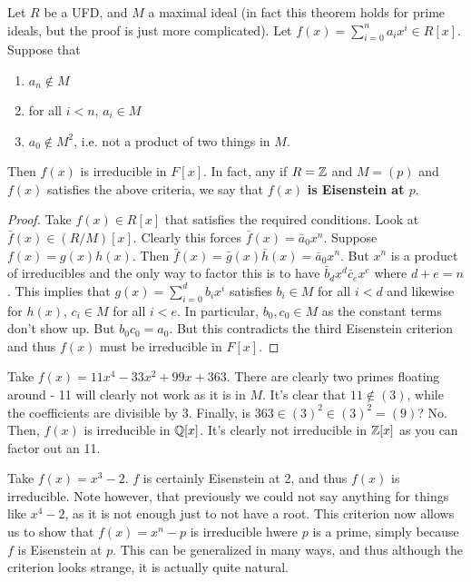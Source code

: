 \documentclass{../mathnotes}
\begin{document}
\begin{thm}
    Let $R$ be a UFD, and $M$ a maximal ideal (in fact this theorem holds for prime ideals, but the proof is just more complicated).
    Let $f(x)=\sum_{i=0}^na_ix^i\in R[x]$. Suppose that
    \begin{enumerate}
        \item $a_n\notin M$
        \item for all $i<n$, $a_i\in M$
        \item $a_0\notin M^2$, i.e. not a product of two things in $M$.
    \end{enumerate}
Then $f(x)$ is irreducible in $F[x]$. In fact, any if $R=\mathbb{Z}$ and $M=(p)$ and $f(x)$ satisfies the above criteria,
we say that $f(x)$ \textbf{is Eisenstein at $p$}.
\end{thm}
\begin{proof}
    Take $f(x)\in R[x]$ that satisfies the required conditions. Look at $\bar f(x)\in (R/M)[x]$. Clearly this forces
    $\bar f(x)=\bar a_0x^n$. Suppose $f(x)=g(x)h(x)$. Then $\bar f(x)=\bar g(x)\bar h(x)=\bar a_0x^n$. But $x^n$ is a product
    of irreducibles and the only way to factor this is to have $\bar b_dx^d\bar c_ex^e$ where $d+e=n$. This implies that
    $g(x)=\sum_{i=0}^db_ix^i$ satisfies $b_i\in M$ for all $i<d$ and likewise for $h(x)$, $c_i\in M$ for all $i<e$. In particular,
    $b_0,c_0\in M$ as the constant terms don't show up. But $b_0c_0=a_0$. But this contradicts the third Eisenstein criterion and
    thus $f(x)$ must be irreducible in $F[x]$.
\end{proof}

\begin{exmp}
    Take $f(x)=11x^4-33x^2+99x+363$. There are clearly two primes floating around - 11 will clearly not work as 
    it is in $M$. It's clear that $11\notin (3)$, while the coefficients are divisible by 3. Finally, is $363\in(3)^2\in(3)^2=(9)$?
    No. Then, $f(x)$ is irreducible in $\mathbb{Q}[x]$. It's clearly not irreducible in $\mathbb{Z}[x]$ as you can factor out an 11.

    Take $f(x)=x^3-2$. $f$ is certainly Eisenstein at 2, and thus $f(x)$ is irreducible. Note however, that previously we 
    could not say anything for things like $x^4-2$, as it is not enough just to not have a root. This criterion now allows us
    to show that $f(x)=x^n-p$ is irreducible hwere $p$ is a prime, simply because $f$ is Eisenstein at $p$. This can be
    generalized in many ways, and thus although the criterion looks strange, it is actually quite natural.
\end{exmp}
\end{document}

